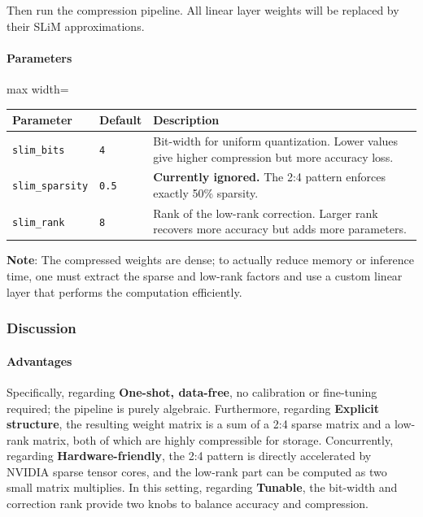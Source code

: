 Then run the compression pipeline. All linear layer weights will be replaced by their SLiM approximations.

\paragraph{Parameters}

\begin{center}
\begin{adjustbox}{max width=\columnwidth}
\renewcommand{\arraystretch}{1.2}
\begin{tabular}{lll}
\toprule
Parameter & Default & Description \\
\midrule
\texttt{slim\_bits} & \texttt{4} & Bit-width for uniform quantization. Lower values give higher compression but more accuracy loss. \\
\texttt{slim\_sparsity} & \texttt{0.5} & \textbf{Currently ignored.} The 2:4 pattern enforces exactly 50\% sparsity. \\
\texttt{slim\_rank} & \texttt{8} & Rank of the low-rank correction. Larger rank recovers more accuracy but adds more parameters. \\

\bottomrule
\end{tabular}
\end{adjustbox}
\end{center}
\textbf{Note}: The compressed weights are dense; to actually reduce memory or inference time, one must extract the sparse and low-rank factors and use a custom linear layer that performs the computation efficiently.


\subsubsection*{Discussion}

\paragraph{Advantages}

Specifically, regarding \textbf{One-shot, data-free}, no calibration or fine-tuning required; the pipeline is purely algebraic. Furthermore, regarding \textbf{Explicit structure}, the resulting weight matrix is a sum of a 2:4 sparse matrix and a low-rank matrix, both of which are highly compressible for storage. Concurrently, regarding \textbf{Hardware-friendly}, the 2:4 pattern is directly accelerated by NVIDIA sparse tensor cores, and the low-rank part can be computed as two small matrix multiplies. In this setting, regarding \textbf{Tunable}, the bit-width and correction rank provide two knobs to balance accuracy and compression.


